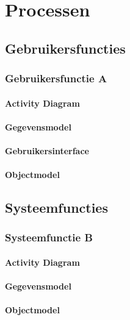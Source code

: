 \section{Processen}
\subsection{Gebruikersfuncties}
\subsubsection{Gebruikersfunctie A}
\paragraph{Activity Diagram}
\paragraph{Gegevensmodel}
\paragraph{Gebruikersinterface}
\paragraph{Objectmodel}
\subsection{Systeemfuncties}
\subsubsection{Systeemfunctie B}
\paragraph{Activity Diagram}
\paragraph{Gegevensmodel}
\paragraph{Objectmodel}
